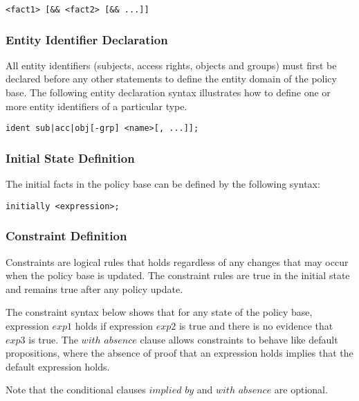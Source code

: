 \documentclass[10pt, twocolumn]{article}
\begin{document}
          \begin{verbatim}<fact1> [&& <fact2> [&& ...]]\end{verbatim}

      \subsubsection{Entity Identifier Declaration}

        All entity identifiers (subjects, access rights, objects and groups)
        must first be declared before any other statements to define the
        entity domain of the policy base. The following entity declaration
        syntax illustrates how to define one or more entity identifiers of a
        particular type.

        \begin{verbatim}ident sub|acc|obj[-grp] <name>[, ...]];\end{verbatim}

      \subsubsection{Initial State Definition}

        The initial facts in the policy base can be defined by the following
        syntax:

        \begin{verbatim}initially <expression>;\end{verbatim}

      \subsubsection{Constraint Definition}

        Constraints are logical rules that holds regardless of any changes
        that may occur when the policy base is updated. The constraint rules
        are true in the initial state and remains true after any policy update.

        The constraint syntax below shows that for any state of the policy
        base, expression $exp1$ holds if expression $exp2$ is true and there
        is no evidence that $exp3$ is true. The $with$ $absence$ clause allows
        constraints to behave like default propositions, where the absence
        of proof that an expression holds implies that the default expression
        holds.

        Note that the conditional clauses $implied$ $by$ and $with$ $absence$
        are optional.
\end{document}
